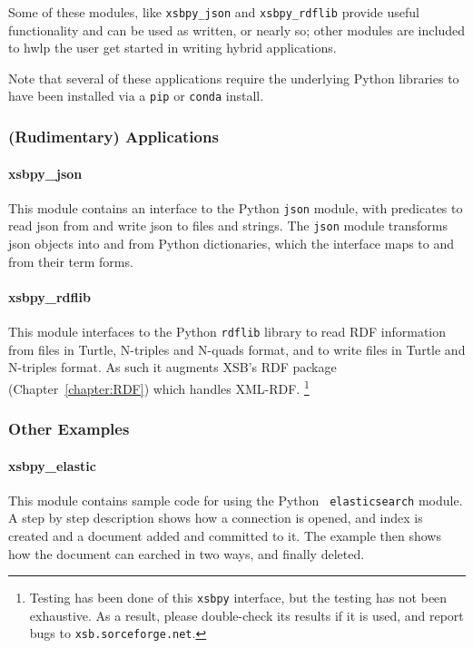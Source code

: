 Some of these modules, like {\tt xsbpy\_json} and {\tt xsbpy\_rdflib}
provide useful functionality and can be used as written, or nearly so;
other modules are included to hwlp the user get started in writing
hybrid applications.

Note that several of these applications require the underlying Python
libraries to have been installed via a {\tt pip} or {\tt conda}
install.

\subsubsection{(Rudimentary) Applications}

\paragraph{xsbpy\_json}
This module contains an interface to the Python {\tt json}
module, with predicates to read json from and write json to files and
strings.  The {\tt json} module transforms json objects into and from Python
dictionaries, which the interface maps to and from their term forms.

\paragraph{xsbpy\_rdflib}
This module interfaces to the Python {\tt rdflib} library to read RDF
information from files in Turtle, N-triples and N-quads format, and to
write files in Turtle and N-triples format.  As such it augments XSB's
RDF package (Chapter~\ref{chapter:RDF}) which handles
XML-RDF. \footnote{Testing has been done of this {\tt xsbpy}
  interface, but the testing has not been exhaustive.  As a result,
  please double-check its results if it is used, and report bugs to
  {\tt xsb.sorceforge.net}.}

\subsubsection{Other Examples}

\paragraph{xsbpy\_elastic}
This module contains sample code for using the Python {\tt
  elasticsearch} module.  A step by step description shows how a
connection is opened, and index is created and a document added and
committed to it.  The example then shows how the document can earched
in two ways, and finally deleted.


